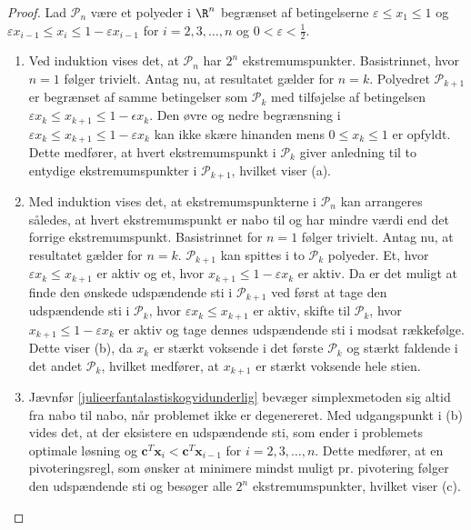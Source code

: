 \begin{proof}
%
Lad $\mathcal{P}_n$ være et polyeder i $\R^n$ begrænset af betingelserne $\varepsilon \leq x_1 \leq 1$ og $\varepsilon x_{i-1} \leq x_i \leq 1 - \varepsilon x_{i-1}$ for $i = 2, 3, \ldots, n$ og $0 < \varepsilon < \frac{1}{2}$.
%
\begin{enumerate}[label = (\alph*)]
\item Ved induktion vises det, at $\mathcal{P}_n$ har $2^n$ ekstremumspunkter. 
Basistrinnet, hvor $n=1$ følger trivielt.
Antag nu, at resultatet gælder for $n=k$.
Polyedret $\mathcal{P}_{k+1}$ er begrænset af samme betingelser som $\mathcal{P}_{k}$ med tilføjelse af betingelsen $\varepsilon x_{k} \leq x_{k+1} \leq 1 - \epsilon x_{k}$.
Den øvre og nedre begrænsning i $\varepsilon x_{k} \leq x_{k+1} \leq 1 - \varepsilon x_{k}$ kan ikke skære hinanden mens $ 0 \leq x_k \leq 1$ er opfyldt.
Dette medfører, at hvert ekstremumspunkt i $\mathcal{P}_{k}$ giver anledning til to entydige ekstremumspunkter i $\mathcal{P}_{k+1}$, hvilket viser (a).
\item Med induktion vises det, at ekstremumspunkterne i $\mathcal{P}_n$ kan arrangeres således, at hvert ekstremumspunkt er nabo til og har mindre værdi end det forrige ekstremumspunkt.
Basistrinnet for $n=1$ følger trivielt.
Antag nu, at resultatet gælder for  $n = k$.
$\mathcal{P}_{k+1}$ kan spittes i to $\mathcal{P}_{k}$ polyeder.
Et, hvor $\varepsilon x_{k} \leq x_{k+1}$ er aktiv og et, hvor $x_{k+1} \leq 1 - \varepsilon x_{k}$ er aktiv.
Da er det muligt at finde den ønskede udspændende sti i $\mathcal{P}_{k+1}$ ved først at tage den udspændende sti i $\mathcal{P}_{k}$, hvor $\varepsilon x_{k} \leq x_{k+1}$ er aktiv, skifte til $\mathcal{P}_{k}$, hvor $x_{k+1} \leq 1 - \varepsilon x_{k}$ er aktiv og tage dennes udspændende sti i modsat rækkefølge.
Dette viser (b), da $x_k$ er stærkt voksende i det første $\mathcal{P}_{k}$ og stærkt faldende i det andet $\mathcal{P}_{k}$, hvilket medfører, at $x_{k+1}$ er stærkt voksende hele stien.
\item Jævnfør \ref{julieerfantalastiskogvidunderlig} bevæger simplexmetoden sig altid fra nabo til nabo, når problemet ikke er degenereret. Med udgangspunkt i (b) vides det, at der eksistere en udspændende sti, som ender i problemets optimale løsning og $\textbf{c}^T\textbf{x}_i < \textbf{c}^T\textbf{x}_{i-1}$ for $i = 2, 3, \ldots ,n$.
Dette medfører, at en pivoteringsregl, som ønsker at minimere mindst muligt pr. pivotering følger den udspændende sti og besøger alle $2^n$ ekstremumspunkter, hvilket viser (c).
\end{enumerate}
\end{proof}
%
